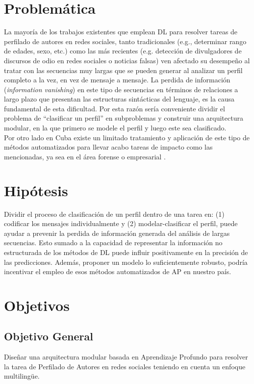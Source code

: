 \section*{Problemática}
La mayoría de los trabajos existentes que emplean DL para resolver tareas de perfilado de autores en redes sociales, tanto tradicionales (e.g., determinar rango de edades, sexo, etc.) como las más recientes (e.g. detección de divulgadores de discursos de odio en redes sociales o noticias falsas) ven afectado su desempeño al tratar con las secuencias muy largas que se pueden generar al analizar un perfil completo a la vez, en vez de mensaje a mensaje. La perdida de información (\textit{information vanishing}) en este tipo de secuencias en términos de relaciones a largo plazo que presentan las estructuras sintácticas del lenguaje, es la causa fundamental de esta dificultad. Por esta razón sería conveniente dividir el problema de ``clasificar un perfil'' en subproblemas y construir una arquitectura modular, en la que primero se modele el perfil y luego este sea clasificado.
\\
Por otro lado en Cuba existe un limitado tratamiento y aplicación de este tipo de métodos automatizados para llevar acabo tareas de impacto como las mencionadas, ya sea en el área forense o empresarial .

\section*{Hipótesis}
Dividir el proceso de clasificación de un perfil dentro de una tarea en: (1) codificar los mensajes individualmente y (2) modelar-clasificar el perfil, puede ayudar a prevenir la perdida de información generada del análisis de largas secuencias. Esto sumado a la capacidad de representar la información no estructurada de los métodos de DL puede influir positivamente en la precisión de las predicciones.  Además, proponer un modelo lo suficientemente robusto, podría incentivar el empleo de esos métodos automatizados  de AP en nuestro país.

\section*{Objetivos}
\subsection*{Objetivo General}
Diseñar una arquitectura modular basada en Aprendizaje Profundo para resolver la tarea de Perfilado de Autores en redes sociales teniendo en cuenta un enfoque multilingüe.
